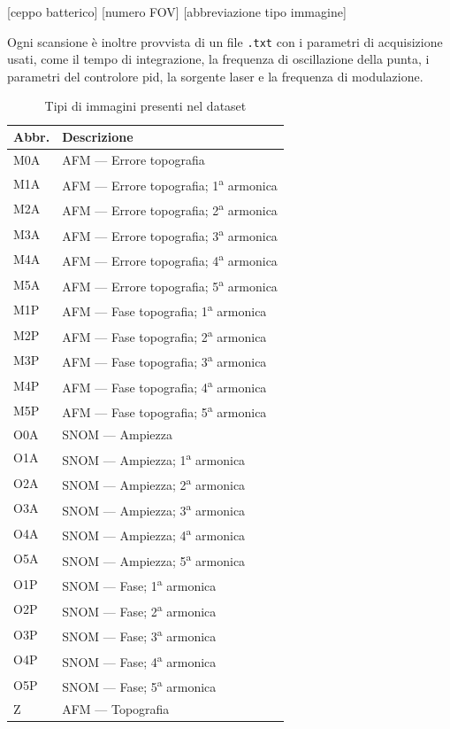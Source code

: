 \documentclass[../main.tex]{subfiles}
\begin{document}
\begin{center}
[ceppo batterico] [numero FOV] [abbreviazione tipo immagine]
\end{center}

Ogni scansione è inoltre provvista di un file \texttt{.txt} con i parametri di acquisizione usati, come il tempo di integrazione, la frequenza di oscillazione della punta, i parametri del controlore \acrshort{pid}, la sorgente laser e la frequenza di modulazione.

\begin{table}[h!t]
\centering
\begin{tabular}{l|l}
	Abbr. & Descrizione\\
	\hline\hline
	M0A & AFM --- Errore topografia\\
	M1A & AFM --- Errore topografia; 1\textsuperscript{a} armonica\\
	M2A & AFM --- Errore topografia; 2\textsuperscript{a} armonica\\
	M3A & AFM --- Errore topografia; 3\textsuperscript{a} armonica\\
	M4A & AFM --- Errore topografia; 4\textsuperscript{a} armonica\\
	M5A & AFM --- Errore topografia; 5\textsuperscript{a} armonica\\
	M1P & AFM --- Fase topografia; 1\textsuperscript{a} armonica\\
	M2P & AFM --- Fase topografia; 2\textsuperscript{a} armonica\\
	M3P & AFM --- Fase topografia; 3\textsuperscript{a} armonica\\
	M4P & AFM --- Fase topografia; 4\textsuperscript{a} armonica\\
	M5P & AFM --- Fase topografia; 5\textsuperscript{a} armonica\\
	O0A & SNOM --- Ampiezza\\
	O1A & SNOM --- Ampiezza; 1\textsuperscript{a} armonica\\
	O2A & SNOM --- Ampiezza; 2\textsuperscript{a} armonica\\
	O3A & SNOM --- Ampiezza; 3\textsuperscript{a} armonica\\
	O4A & SNOM --- Ampiezza; 4\textsuperscript{a} armonica\\
	O5A & SNOM --- Ampiezza; 5\textsuperscript{a} armonica\\
	O1P & SNOM --- Fase; 1\textsuperscript{a} armonica\\
	O2P & SNOM --- Fase; 2\textsuperscript{a} armonica\\
	O3P & SNOM --- Fase; 3\textsuperscript{a} armonica\\
	O4P & SNOM --- Fase; 4\textsuperscript{a} armonica\\
	O5P & SNOM --- Fase; 5\textsuperscript{a} armonica\\
	Z & AFM --- Topografia
\end{tabular}
\caption{Tipi di immagini presenti nel dataset}
\end{table}
\end{document}
